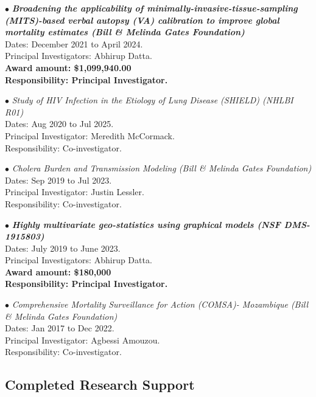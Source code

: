\documentclass[12pt]{article}
\newcommand{\dn}[1]{{\color{black} {#1}}}
\begin{document}
\item[$\bullet$]
{\it \textbf{Broadening the applicability of minimally-invasive-tissue-sampling (MITS)-based verbal autopsy (VA) calibration to improve global mortality estimates (Bill \& Melinda Gates Foundation)}}\\[0.0em]
\dn{Dates:} December 2021 to April 2024.\\
\dn{Principal Investigators:} Abhirup Datta.\\
\textbf{\dn{Award amount:} \$1,099,940.00\\}
\textbf{\dn{Responsibility:} Principal Investigator.}

\item[$\bullet$]
{\it Study of HIV Infection in the Etiology of Lung Disease (SHIELD) (NHLBI R01)}\\[0.0em]
\dn{Dates:} Aug 2020 to Jul 2025.\\
\dn{Principal Investigator:} Meredith McCormack.\\
\dn{Responsibility:} Co-investigator.

\item[$\bullet$]
{\it Cholera Burden and Transmission Modeling (Bill \& Melinda Gates Foundation)}\\[0.0em]
\dn{Dates:} Sep 2019 to Jul 2023.\\
\dn{Principal Investigator:} Justin Lessler.\\
\dn{Responsibility:} Co-investigator.

\item[$\bullet$]
{\it \textbf{Highly multivariate geo-statistics using graphical models (NSF DMS-1915803)}}\\[0.0em]
\dn{Dates:} July 2019 to June 2023.\\
\dn{Principal Investigators:} Abhirup Datta.\\
\textbf{\dn{Award amount:} \$180,000}\\
\textbf{\dn{Responsibility:} Principal Investigator.}

\item[$\bullet$]
{\it Comprehensive Mortality Surveillance for Action (COMSA)- Mozambique (Bill \& Melinda Gates Foundation)}\\[0.0em]
\dn{Dates:} Jan 2017 to Dec 2022.\\
\dn{Principal Investigator:} Agbessi Amouzou.\\
\dn{Responsibility:} Co-investigator.

\subsection*{Completed Research Support}
\end{document}

